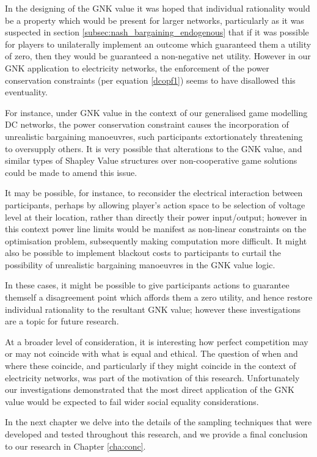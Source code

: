 In the designing of the GNK value it was hoped that individual rationality would be a property which would be present for larger networks, particularly as it was suspected in section \ref{subsec:nash_bargaining_endogenous} that if it was possible for players to unilaterally implement an outcome which guaranteed them a utility of zero, then they would be guaranteed a non-negative net utility.
However in our GNK application to electricity networks, the enforcement of the power conservation constraints (per equation \ref{dcopf1}) seems to have disallowed this eventuality.

For instance, under GNK value in the context of our generalised game modelling DC networks, the power conservation constraint causes the incorporation of unrealistic bargaining manoeuvres, such participants extortionately threatening to oversupply others.
It is very possible that alterations to the GNK value, and similar types of Shapley Value structures over non-cooperative game solutions could be made to amend this issue.

It may be possible, for instance, to reconsider the electrical interaction between participants, perhaps by allowing player's action space to be selection of voltage level at their location, rather than directly their power input/output; however in this context power line limits would be manifest as non-linear constraints on the optimisation problem, subsequently making computation more difficult.
It might also be possible to implement blackout costs to participants to curtail the possibility of unrealistic bargaining manoeuvres in the GNK value logic.

In these cases, it might be possible to give participants actions to guarantee themself a disagreement point which affords them a zero utility, and hence restore individual rationality to the resultant GNK value; however these investigations are a topic for future research.


At a broader level of consideration, it is interesting how perfect competition may or may not coincide with what is equal and ethical.
The question of when and where these coincide, and particularly if they might coincide in the context of electricity networks, was part of the motivation of this research.
Unfortunately our investigations demonstrated that the most direct application of the GNK value would be expected to fail wider social equality considerations.

In the next chapter we delve into the details of the sampling techniques that were developed and tested throughout this research, and we provide a final conclusion to our research in Chapter \ref{cha:conc}. 





